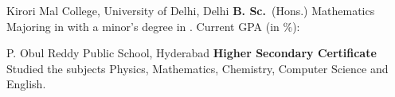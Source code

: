 {%
	Kirori Mal College, University of Delhi, Delhi}
{%
	\textbf{B. Sc.}~(Hons.) Mathematics}
{%
	Majoring in  with a minor's degree in . Current GPA (in \%): 
}

{%
	P. Obul Reddy Public School, Hyderabad}
{%
	\textbf{Higher Secondary Certificate}~}
{%
	Studied the subjects Physics, Mathematics, Chemistry, Computer Science and English.}